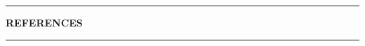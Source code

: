 \documentclass[12pt, a4paper, openright]{report}
\begin{document}
% 
% 




\appendix


\clearpage

\begin{center}
  {\color{StarGold}\rule{0.4\textwidth}{0.5pt}}
\end{center}
\vspace{0.8cm}
{\centering\Large\bfseries\color{DeepSpace}REFERENCES\par}
\vspace{0.8cm}
\begin{center}
  {\color{StarGold}\rule{0.4\textwidth}{0.5pt}}
\end{center}
\vspace{1.2cm}

\nocite{*}
\label{bibliography}
\printbibliography[heading=none]

\end{document}
